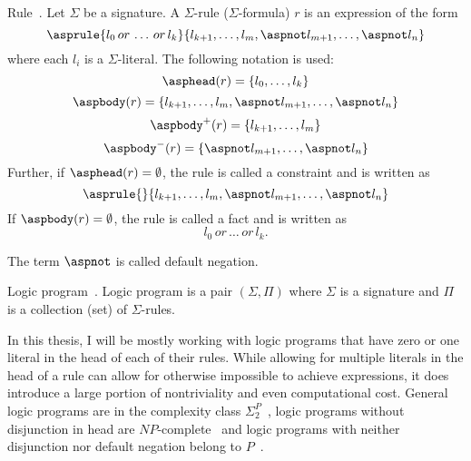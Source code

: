 \begin{definition}{Rule~\cite{KRHandbook}.}\label{def:rule}
    Let $\Sigma$ be a signature. A $\Sigma$-rule ($\Sigma$-formula) $r$ is an expression of the form
    \begin{equation*}
        \asprule{l_0\, or\, \ldots\, or\, l_k}{l_{k+1}, \ldots, l_{m}, \aspnot l_{m+1}, \ldots, \aspnot l_{n}}
    \end{equation*}
    where each $l_i$ is a $\Sigma$-literal. The following notation is used:
    \begin{equation*}
        \asphead(r) = \{l_0, \ldots, l_k\}
    \end{equation*}
    \begin{equation*}
        \aspbody(r) = \{l_{k+1}, \ldots, l_{m}, \aspnot l_{m+1}, \ldots, \aspnot l_n\}
    \end{equation*}
    \begin{equation*}
        \aspbody^+(r) = \{l_{k+1}, \ldots, l_{m}\}
    \end{equation*}
    \begin{equation*}
        \aspbody^-(r) = \{\aspnot l_{m+1}, \ldots, \aspnot l_n\}
    \end{equation*}
    Further, if $\asphead(r) = \emptyset$, the rule is called a constraint and is written as
    \begin{equation*}
        \asprule{}{l_{k+1}, \ldots, l_{m}, \aspnot l_{m+1}, \ldots, \aspnot l_{n}}
    \end{equation*}
    If $\aspbody(r) = \emptyset$, the rule is called a fact and is written as
    \begin{equation*}
        l_0\, or\, \ldots\, or\, l_k.
    \end{equation*}

    The term $\aspnot$ is called default negation.
\end{definition}

\begin{definition}{Logic program~\cite{KRHandbook}.}
    Logic program is a pair $(\Sigma, \Pi)$ where $\Sigma$ is a signature
    and $\Pi$ is a collection (set) of $\Sigma$-rules.
\end{definition}

In this thesis, I will be mostly working with logic programs that have
zero or one literal in the head of each of their rules.
While allowing for multiple literals in the head of a rule can allow
for otherwise impossible to achieve expressions, it does introduce
a large portion of nontriviality and even computational cost.
General logic programs are in the complexity class $\Sigma_2^P$~\cite{dis_datalog_complexity},
logic programs without disjunction in head are $NP$-complete~\cite{schlipf1995_computation}
and logic programs with neither disjunction nor default negation belong to $P$~\cite{KRHandbook}.

